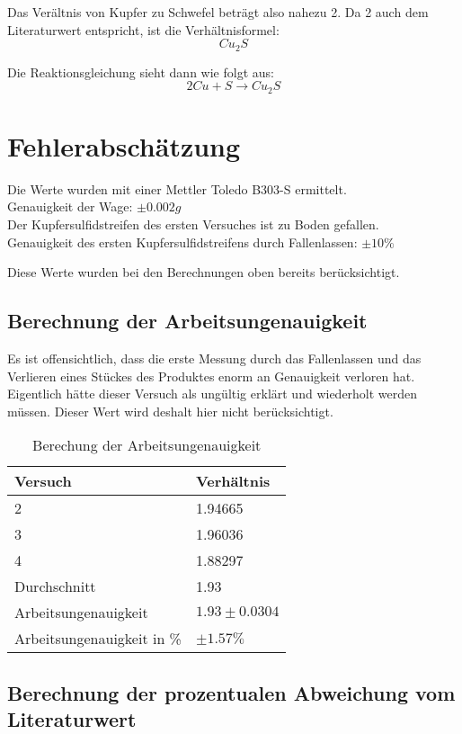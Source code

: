 \documentclass[11pt,paper=a4,final]{scrartcl}
\begin{document}
{Das Ver\"altnis von Kupfer zu Schwefel betr\"agt also nahezu 2. Da 2 auch dem
Literaturwert entspricht, ist die Verh\"altnisformel:
\[ Cu_2S \]

Die Reaktionsgleichung sieht dann wie folgt aus:
\[ 2Cu + S \to Cu_2S \]
\section{Fehlerabsch\"atzung}
Die Werte wurden mit einer Mettler Toledo B303-S ermittelt.\\
Genauigkeit der Wage: \(\pm 0.002g\)\\
Der Kupfersulfidstreifen des ersten Versuches ist zu Boden gefallen. \\
Genauigkeit des ersten Kupfersulfidstreifens durch Fallenlassen: \(\pm 10\% \)

Diese Werte wurden bei den Berechnungen oben bereits ber\"ucksichtigt.
\subsection{Berechnung der Arbeitsungenauigkeit}
Es ist offensichtlich, dass die erste Messung durch das Fallenlassen und das
Verlieren eines St\"uckes des Produktes enorm an Genauigkeit verloren hat.
Eigentlich h\"atte dieser Versuch als ung\"ultig erkl\"art und wiederholt werden
m\"ussen. Dieser Wert wird deshalt hier nicht ber\"ucksichtigt.

\begin{table}[h!]
  \centering
  \begin{tabular}{|l|l|}\hline
    \bf Versuch & \bf Verh\"altnis \\ \hline
    2	& 1.94665 \\ \hline
    3 	& 1.96036 \\ \hline
    4	& 1.88297 \\ \hline
    Durchschnitt & 1.93 \\ \hline
    Arbeitsungenauigkeit & \(1.93 \pm 0.0304 \) \\ \hline
    Arbeitsungenauigkeit in \% & \(\pm 1.57\%\) \\ \hline
  \end{tabular}
  \caption{Berechung der Arbeitsungenauigkeit}
\end{table}

\subsection{Berechnung der prozentualen Abweichung vom Literaturwert}

}
\end{document}

